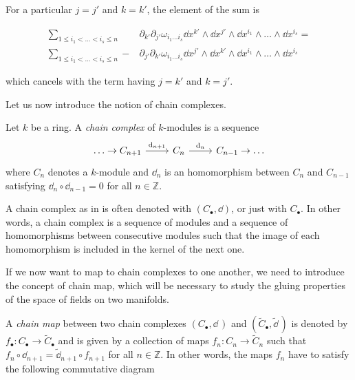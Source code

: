 For a particular $j=j'$ and $k=k'$, the element of the sum is

\begin{align*}
     \sum_{1 \leq i_1 < \ldots < i_s \leq n} \phantom{-}
     &\partial_{k'} \partial_{j'} \omega_{i_1 \ldots i_s}
     \dd x^{k'} \wedge \dd x^{j'} \wedge \dd x^{i_1} \wedge \ldots \wedge \dd x^{i_s} = \\
     \sum_{1 \leq i_1 < \ldots < i_s \leq n}
     - &\partial_{j'} \partial_{k'} \omega_{i_1 \ldots i_s}
     \dd x^{j'} \wedge \dd x^{k'} \wedge \dd x^{i_1} \wedge \ldots \wedge \dd x^{i_s}
\end{align*}

which cancels with the term having $j = k'$ and $k=j'$.

Let us now introduce the notion of chain complexes.

\begin{definition}
\label{def:chain}
    Let $k$ be a ring. A \emph{chain complex} of $k$-modules is a sequence
    \begin{equation*}
        \begin{tikzcd}
            \ldots \rightarrow  C_{n+1} \arrow[r, "\dd _{n+1}"] & C_n
            \arrow[r, "\dd _{n}"] & C_{n-1} \rightarrow \ldots
        \end{tikzcd}
    \end{equation*}
    where $C_n$ denotes a $k$-module and $\dd _n$ is an homomorphism between $C_n$ and $C_{n-1}$ satisfying $\dd _n \circ \dd _{n-1} = 0$ for all $n \in \mathbb{Z}$.
\end{definition}

A chain complex as in  is often denoted with $(C_{\bullet}, \dd)$, or just with $C_{\bullet}$.
In other words, a chain complex is a sequence of modules and a sequence of homomorphisms between consecutive modules such that the image of each homomorphism is included in the kernel of the next one.

If we now want to map to chain complexes to one another, we need to introduce the concept of chain map, which will be necessary to study the gluing properties of the space of fields on two manifolds.

\begin{definition}
\label{def:chain_map}
    A \emph{chain map} between two chain complexes $(C_\bullet, \dd \,)$ and $(\widetilde{C}_\bullet, \widetilde{\dd} \,)$ is denoted by $f_\bullet : C_\bullet \rightarrow \widetilde{C}_\bullet$ and is given by a collection of maps $f_n : C_n \rightarrow \widetilde{C}_n$ such that
    $f_n \circ \dd_{n+1} = \widetilde{\dd}_{n+1} \circ f_{n+1}$ for all $n \in \mathbb{Z}$.
    In other words, the maps $f_n$ have to satisfy the following commutative diagram
    \begin{equation*}
        
    \end{equation*}
\end{definition}

